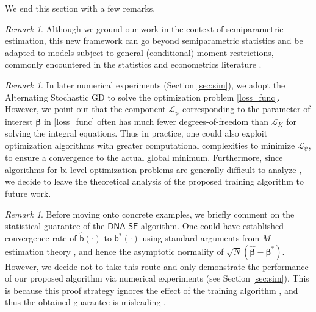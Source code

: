 \documentclass{article}
\def\dnase{{\mathsf{DNA\mbox{-}SE}}}
\def\sfb{\mathsf{b}}
\def\sfb{\mathsf{b}}
\theoremstyle{plain}
\theoremstyle{definition}
\theoremstyle{remark}
\newtheorem{remark}[theorem]{Remark}
\def\bbeta{\boldsymbol{\beta}}
\def\hat{\widehat}
\begin{document}
We end this section with a few remarks.
\begin{remark}
Although we ground our work in the context of semiparametric estimation, this new framework can go beyond semiparametric statistics and be adapted to models subject to general (conditional) moment restrictions, commonly encountered in the statistics and econometrics literature \citep{ai2003efficient, chen2018overidentification, cui2023semiparametric}.
\end{remark}
\begin{remark}
In later numerical experiments (Section \ref{sec:sim}), we adopt the Alternating Stochastic GD \citep{wilson2017marginal, zhou2020towards} to solve the optimization problem \eqref{loss_func}. However, we point out that the component $\mathcal{L}_{\psi}$ corresponding to the parameter of interest $\bbeta$ in \eqref{loss_func} often has much fewer degrees-of-freedom than $\mathcal{L}_{K}$ for solving the integral equations. Thus in practice, one could also exploit optimization algorithms with greater computational complexities to minimize $\mathcal{L}_{\psi}$, to ensure a convergence to the actual global minimum. Furthermore, since algorithms for bi-level optimization problems are generally difficult to analyze \citep{chen2021closing}, we decide to leave the theoretical analysis of the proposed training algorithm to future work.
\end{remark}

\begin{remark}
Before moving onto concrete examples, we briefly comment on the statistical guarantee of the $\dnase$ algorithm. One could have established convergence rate of $\hat{\sfb} (\cdot)$ to $\sfb^{\ast} (\cdot)$ using standard arguments from $M$-estimation theory \citep{schmidt2020nonparametric, van2023weak}, and hence the asymptotic normality of $\sqrt{N} (\hat{\bbeta} - \bbeta^\ast)$. However, we decide not to take this route and only demonstrate the performance of our proposed algorithm via numerical experiments (see Section \ref{sec:sim}). This is because this proof strategy ignores the effect of the training algorithm \citep{neyshabur2017implicit, goel2020superpolynomial, vempala2019gradient}, and thus the obtained guarantee is misleading \citep{xu2022deepmed}.
\end{remark}
\end{document}
